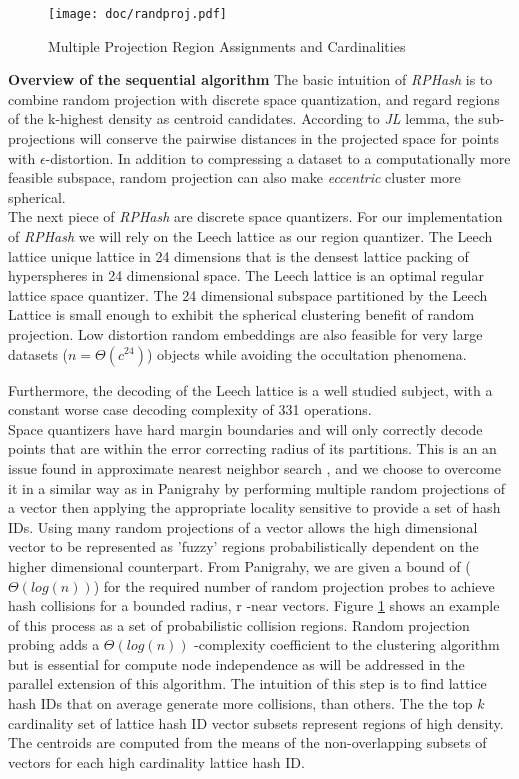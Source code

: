 \documentclass[a4paper,10pt]{article}
\begin{document}
\begin{figure}%
\centering
\texttt{[image: doc/randproj.pdf]}
\caption*{Multiple Projection Region Assignments and
Cardinalities}\label{randproj}
\end{figure}
\textbf{Overview of the sequential algorithm}
The basic intuition of \emph{RPHash} is to combine 
random projection with discrete space quantization,
and regard regions of the k-highest density as centroid candidates.
 According to
\emph{JL} lemma, the sub-projections will conserve the pairwise distances
in the projected space for points with $\epsilon$-distortion.
In addition to compressing a dataset to a computationally more feasible
subspace, random 
projection can also make \emph{eccentric} cluster more
spherical\cite{Dasgupta2000}\cite{Vempala}.\\
The next piece of \emph{RPHash} are discrete space quantizers. For our
implementation
of \emph{RPHash} we will rely on the Leech lattice as our region quantizer. The
Leech
lattice unique lattice in 24 dimensions that is the densest lattice packing of
hyperspheres
in 24 dimensional space. The Leech lattice is an optimal regular lattice space quantizer.
The 24
dimensional subspace partitioned by the Leech Lattice is small enough to exhibit the
spherical clustering benefit of random 
projection. Low distortion random embeddings are also feasible for very large datasets
($n = \Theta(c^{24})$) objects while avoiding the occultation phenomena\cite{Urruty2007}.
 

Furthermore, the decoding of the Leech
lattice is a well studied subject, with a constant worse case decoding complexity 
of 331 operations\cite{Vardy95}.
\\
Space quantizers have hard margin boundaries and will only correctly decode
points that are within
the error correcting radius of its partitions. This is an an issue found in
approximate nearest neighbor search \cite{panigrahy}\cite{Andoni}, and we choose
to
overcome it in a similar way as in Panigrahy\cite{panigrahy} by performing multiple
random projections of a vector then applying the appropriate locality sensitive to provide a set of
hash IDs. Using many random projections
of a vector
allows the high dimensional vector to be represented as
'fuzzy' regions probabilistically dependent on the higher dimensional
counterpart. From Panigrahy\cite{panigrahy}, we are given a bound of ($\Theta(log(n))$) for
 the required number of random projection probes to achieve 
hash collisions for a bounded radius, r -near vectors.
Figure \ref{randproj} shows 
an example of this process as a set of probabilistic collision regions.
Random projection probing adds a $\Theta(log(n))$ -complexity coefficient to the clustering algorithm
but is essential for compute node independence as will be addressed in the parallel extension of this algorithm. 
The intuition of this step is to find lattice hash IDs that on average generate more
collisions, than others. The the top $k$ cardinality set of lattice hash ID vector subsets 
represent regions of high density. The centroids are computed from the means of
the non-overlapping subsets of vectors 
for each high cardinality lattice hash ID.
\end{document}
